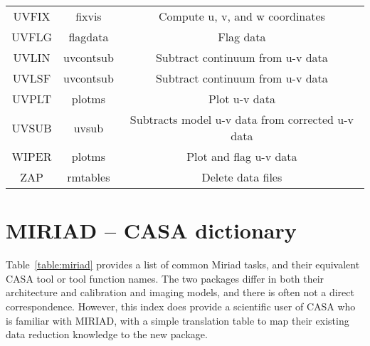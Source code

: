 \begin{table}[ht]
\begin{center}
\begin{tabular}{|c|c|c|}
UVFIX 	 & fixvis  	 & Compute u, v, and w coordinates\\
UVFLG 	 & flagdata 	 & Flag data\\
UVLIN 	 & uvcontsub 	 & Subtract continuum from u-v data\\
UVLSF 	 & uvcontsub 	 & Subtract continuum from u-v data\\
UVPLT 	 & plotms  	 & Plot u-v data\\
UVSUB 	 & uvsub    	 & Subtracts model u-v data from corrected u-v data\\
WIPER 	 & plotms 	         & Plot and flag u-v data\\
ZAP 	 & rmtables 	 & Delete data files \\
\hline
\end{tabular}
\end{center}
\end{table}

\section{MIRIAD -- CASA dictionary}
\label{section:dict.miriad}

Table~\ref{table:miriad} provides a list of common Miriad tasks, and their
equivalent CASA tool or tool function names. The two packages differ
in both their architecture and calibration and imaging models, and
there is often not a direct correspondence. However, this index does
provide a scientific user of CASA who is familiar with MIRIAD, with
a simple translation table to map their existing data reduction
knowledge to the new package.


